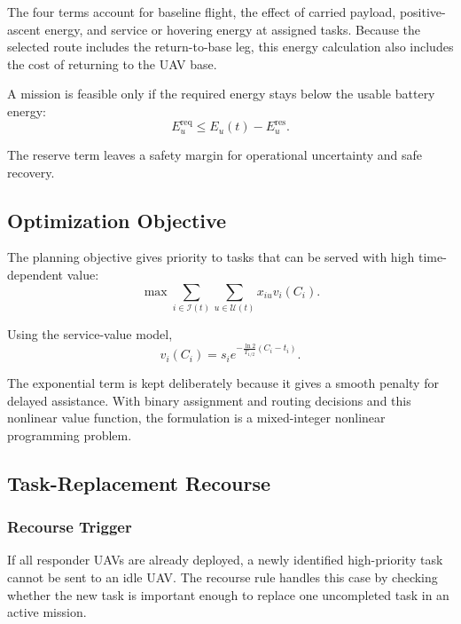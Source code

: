 \documentclass[conference]{IEEEtran}
\begin{document}
The four terms account for baseline flight, the effect of carried payload, positive-ascent energy, and service or hovering energy at assigned tasks. Because the selected route includes the return-to-base leg, this energy calculation also includes the cost of returning to the UAV base.

A mission is feasible only if the required energy stays below the usable battery energy:
\begin{equation}
E_u^{\mathrm{req}}
\leq
E_u(t)-E_u^{\mathrm{res}}.
\end{equation}

The reserve term leaves a safety margin for operational uncertainty and safe recovery.

\subsection{Optimization Objective}

The planning objective gives priority to tasks that can be served with high time-dependent value:
\begin{equation}
\boxed{
\max
\sum_{i\in\mathcal{I}(t)}
\sum_{u\in\mathcal{U}(t)}
x_{iu}v_i(C_i)
}.
\end{equation}

Using the service-value model,
\begin{equation}
v_i(C_i)
=
s_i
e^{-\frac{\ln2}{T_{1/2}}(C_i-t_i)}.
\end{equation}

The exponential term is kept deliberately because it gives a smooth penalty for delayed assistance. With binary assignment and routing decisions and this nonlinear value function, the formulation is a mixed-integer nonlinear programming problem.

\subsection{Task-Replacement Recourse}

\subsubsection{Recourse Trigger}

If all responder UAVs are already deployed, a newly identified high-priority task cannot be sent to an idle UAV. The recourse rule handles this case by checking whether the new task is important enough to replace one uncompleted task in an active mission.
\end{document}
